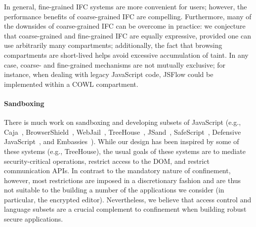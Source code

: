 In general, fine-grained IFC systems are more convenient for users;
however, the performance benefits of coarse-grained IFC are compelling.
Furthermore, many of the downsides of coarse-grained IFC can be overcome
in practice: we conjecture that coarse-grained and fine-grained IFC are
equally expressive, provided one can use arbitrarily many compartments;
additionally, the fact that browsing compartments are short-lived helps
avoid excessive accumulation of taint.  In any case, coarse- and
fine-grained mechanisms are not mutually exclusive; for instance, when
dealing with legacy JavaScript code, JSFlow could be implemented within
a COWL compartment.

\paragraph{Sandboxing}
There is much work on sandboxing and developing subsets of JavaScript (e.g.,
Caja~\cite{GoogleCaja}, BrowserShield~\cite{Reis:2007},
WebJail~\cite{VanAcker:2011}, TreeHouse~\cite{Ingram:2012},
JSand~\cite{Agten:2012:JCC}, SafeScript~\cite{SafeScript}, Defensive
JavaScript~\cite{djs}, and Embassies~\cite{Howell:2013}). 
%
While our design has been inspired by some of these systems (e.g.,
TreeHouse), the usual goals of these systems are to mediate
security-critical operations, restrict access to the DOM, and restrict
communication APIs\@.
%
In contrast to the mandatory nature of confinement, however, most restrictions
are imposed in a discretionary fashion and are thus not suitable to the
building a number of the applications we consider (in particular, the encrypted
editor).
%
Nevertheless, we believe that access control and language subsets are a crucial
complement to confinement when building robust secure applications.

